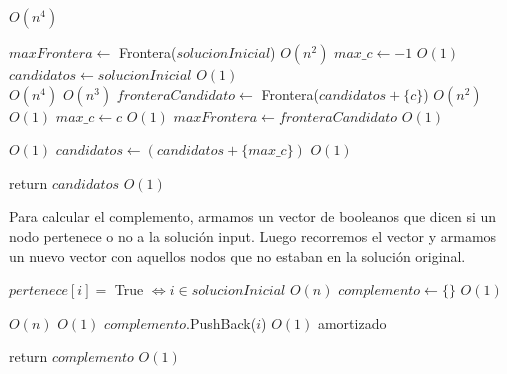 \begin{algorithm}[H]
\begin{algorithmic}
        \Comment $O(n^4)$

    \State $maxFrontera \gets$ Frontera($solucionInicial$)              \Comment $O(n^2)$
    \State $max\_c \gets -1$                                            \Comment $O(1)$
    \State $candidatos \gets solucionInicial$                           \Comment $O(1)$\\

                                                \Comment $O(n^4)$
                                             \Comment $O(n^3)$
            \State $fronteraCandidato \gets$ Frontera($candidatos + \{c\}$)     \Comment $O(n^2)$
                                          \Comment $O(1)$
                \State $max\_c \gets c$                                         \Comment $O(1)$
                \State $maxFrontera \gets fronteraCandidato$                    \Comment $O(1)$\\
            \EndIf
        \EndIf
    \EndFor

                                               \Comment $O(1)$
        \State $candidatos \gets (candidatos + \{max\_c\})$         \Comment $O(1)$
    \EndIf

    \State return $candidatos$                      \Comment $O(1)$

\EndFunction
\end{algorithmic}
\end{algorithm}

Para calcular el complemento, armamos un vector de booleanos que dicen si un nodo pertenece o no a la solución input. Luego recorremos el vector y armamos un nuevo vector con aquellos nodos que no estaban en la solución original.

\begin{algorithm}[H]
\begin{algorithmic}
    \State $pertenece[i] =$ True $\iff i \in solucionInicial$   \Comment $O(n)$
    \State $complemento \gets \{\}$                             \Comment $O(1)$

    \For{$i \in [0..n)$}                                        \Comment $O(n)$
                                  \Comment $O(1)$
            \State $complemento$.PushBack($i$)                  \Comment $O(1)$  amortizado
        \EndIf
    \EndFor

    \State return $complemento$                                 \Comment $O(1)$

\EndFunction
\end{algorithmic}
\end{algorithm}


